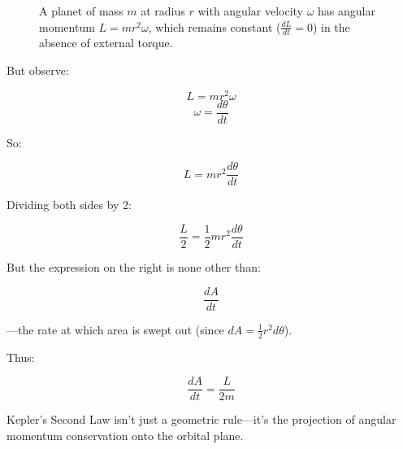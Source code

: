 \begin{figure}[H]
    \centering
    \caption{A planet of mass \(m\) at radius \(r\) with angular velocity \(\omega\) has angular momentum \(L = m r^2 \omega\), which remains constant (\(\tfrac{dL}{dt}=0\)) in the absence of external torque.}
    \label{fig:kepler-angular-momentum}
\end{figure}





But observe:

\[
L = m r^2 \omega
\]
\[
\omega = \frac{d\theta}{dt}
\]

So:

\[
L = m r^2 \frac{d\theta}{dt}
\]

Dividing both sides by 2:

\[
\frac{L}{2} = \frac{1}{2} m r^2 \frac{d\theta}{dt}
\]

But the expression on the right is none other than:

\[
\frac{dA}{dt}
\]

—the rate at which area is swept out (since \( dA = \frac{1}{2} r^2 d\theta \)).

Thus:

\[
\frac{dA}{dt} = \frac{L}{2m}
\]

Kepler’s Second Law isn’t just a geometric rule—it’s the projection of angular momentum conservation 
onto the orbital plane.





